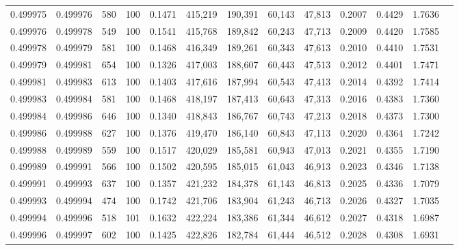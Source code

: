 \begin{tabular}{rrrrrrrrrrrrr}
0.499975 & 0.499976 &   580 & 100 &                                     0.1471 & 415,219 & 190,391 &  60,143 &  47,813 & 0.2007 & 0.4429 & 1.7636 \\
0.499976 & 0.499978 &   549 & 100 &                                     0.1541 & 415,768 & 189,842 &  60,243 &  47,713 & 0.2009 & 0.4420 & 1.7585 \\
0.499978 & 0.499979 &   581 & 100 &                                     0.1468 & 416,349 & 189,261 &  60,343 &  47,613 & 0.2010 & 0.4410 & 1.7531 \\
0.499979 & 0.499981 &   654 & 100 &                                     0.1326 & 417,003 & 188,607 &  60,443 &  47,513 & 0.2012 & 0.4401 & 1.7471 \\
0.499981 & 0.499983 &   613 & 100 &                                     0.1403 & 417,616 & 187,994 &  60,543 &  47,413 & 0.2014 & 0.4392 & 1.7414 \\
0.499983 & 0.499984 &   581 & 100 &                                     0.1468 & 418,197 & 187,413 &  60,643 &  47,313 & 0.2016 & 0.4383 & 1.7360 \\
0.499984 & 0.499986 &   646 & 100 &                                     0.1340 & 418,843 & 186,767 &  60,743 &  47,213 & 0.2018 & 0.4373 & 1.7300 \\
0.499986 & 0.499988 &   627 & 100 &                                     0.1376 & 419,470 & 186,140 &  60,843 &  47,113 & 0.2020 & 0.4364 & 1.7242 \\
0.499988 & 0.499989 &   559 & 100 &                                     0.1517 & 420,029 & 185,581 &  60,943 &  47,013 & 0.2021 & 0.4355 & 1.7190 \\
0.499989 & 0.499991 &   566 & 100 &                                     0.1502 & 420,595 & 185,015 &  61,043 &  46,913 & 0.2023 & 0.4346 & 1.7138 \\
0.499991 & 0.499993 &   637 & 100 &                                     0.1357 & 421,232 & 184,378 &  61,143 &  46,813 & 0.2025 & 0.4336 & 1.7079 \\
0.499993 & 0.499994 &   474 & 100 &                                     0.1742 & 421,706 & 183,904 &  61,243 &  46,713 & 0.2026 & 0.4327 & 1.7035 \\
0.499994 & 0.499996 &   518 & 101 &                                     0.1632 & 422,224 & 183,386 &  61,344 &  46,612 & 0.2027 & 0.4318 & 1.6987 \\
0.499996 & 0.499997 &   602 & 100 &                                     0.1425 & 422,826 & 182,784 &  61,444 &  46,512 & 0.2028 & 0.4308 & 1.6931 \\

\end{tabular}
